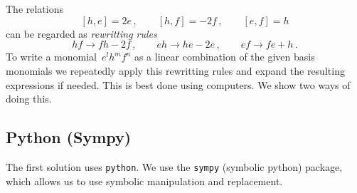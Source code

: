 \section{}

The relations
\[
  [h,e] = 2e \,,
  \qquad
  [h,f] = -2f \,,
  \qquad
  [e,f] = h
\]
can be regarded as \emph{rewritting rules}
\[
  hf \to fh - 2f \,,
  \qquad
  eh \to he - 2e \,,
  \qquad
  ef \to fe + h \,.
\]
To write a monomial~$e^l h^m f^n$ as a linear combination of the given basis monomials we repeatedly apply this rewritting rules and expand the resulting expressions if needed.
This is best done using computers.
We show two ways of doing this.





\subsection*{Python (Sympy)}

The first solution uses \texttt{python}.
We use the \texttt{sympy} (symbolic python) package, which allows us to use symbolic manipulation and replacement.

